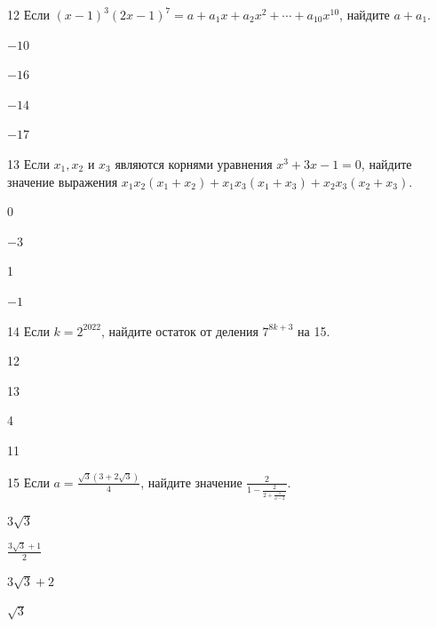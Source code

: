 \documentclass[14pt]{article}
\begin{document}
\begin{questionbox}{12}
    Если $(x - 1)^3(2x - 1)^7 = a + a_1x + a_2x^2 + \cdots + a_{10}x^{10}$, найдите $a + a_1$.
    \begin{options}
        \item $-10$
        \item $-16$
        \item $-14$
        \item $-17$
    \end{options}
\end{questionbox}



\begin{questionbox}{13}
    Если \( x_1, x_2 \) и \( x_3 \) являются корнями уравнения \( x^3 + 3x - 1 = 0 \), найдите значение выражения \( x_1x_2(x_1 + x_2) + x_1x_3(x_1 + x_3) + x_2x_3(x_2 + x_3) \).
    \begin{options}
        \item 0
        \item $-3$
        \item 1
        \item $-1$
    \end{options}
\end{questionbox}

\begin{questionbox}{14}
    Если \( k = 2^{2022} \), найдите остаток от деления \( 7^{8k+3} \) на 15.
    \begin{options}
        \item 12
        \item 13
        \item 4
        \item 11
    \end{options}
\end{questionbox}

\begin{questionbox}{15}
    Если \( a = \frac{\sqrt{3}(3+2\sqrt{3})}{4} \), найдите значение \( \frac{2}{1-\frac{2}{2+\frac{1}{a-2}}} \).
    \begin{options}
        \item \(3\sqrt{3}\)
        \item \(\frac{3\sqrt{3}+1}{2}\)
        \item \(3\sqrt{3} + 2\)
        \item \(\sqrt{3}\)
    \end{options}
\end{questionbox}
\end{document}
